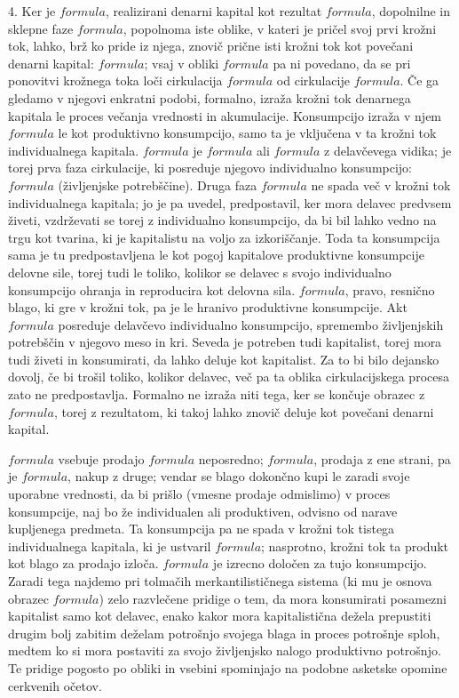 \documentclass[kapital_02.tex]{subfiles}
\begin{document}
4. Ker je \( formula \), realizirani denarni kapital kot rezultat \( formula \), dopolnilne in sklepne faze \( formula \), popolnoma iste oblike, v kateri je pričel svoj prvi krožni tok, lahko, brž ko pride iz njega, znovič prične isti krožni tok kot povečani denarni kapital: \( formula \); vsaj v obliki \( formula \) pa ni povedano, da se pri ponovitvi krožnega toka loči cirkulacija \( formula \) od cirkulacije \( formula \). Če ga gledamo v njegovi enkratni podobi, formalno, izraža krožni tok denarnega kapitala le proces večanja vrednosti in akumulacije. Konsumpcijo izraža v njem \( formula \) le kot produktivno konsumpcijo, samo ta je vključena v ta krožni tok individualnega kapitala. \( formula \) je \( formula \) ali \( formula \) z delavčevega vidika; je torej prva faza cirkulacije, ki posreduje njegovo individualno konsumpcijo: \( formula \) (življenjske potrebščine). Druga faza \( formula \) ne spada več v krožni tok individualnega kapitala; jo je pa uvedel, predpostavil, ker mora delavec predvsem živeti, vzdrževati se torej z individualno konsumpcijo, da bi bil lahko vedno na trgu kot tvarina, ki je kapitalistu na voljo za izkoriščanje. Toda ta konsumpcija sama je tu predpostavljena le kot pogoj kapitalove produktivne konsumpcije delovne sile, torej tudi le toliko, kolikor se delavec s svojo individualno konsumpcijo ohranja in reproducira kot delovna sila. \( formula \), pravo, resnično blago, ki gre v krožni tok, pa je le hranivo produktivne konsumpcije. Akt \( formula \) posreduje delavčevo individualno konsumpcijo, spremembo življenjskih potrebščin v njegovo meso in kri. Seveda je potreben tudi kapitalist, torej mora tudi živeti in konsumirati, da lahko deluje kot kapitalist. Za to bi bilo dejansko dovolj, če bi trošil toliko, kolikor delavec, več pa ta oblika cirkulacijskega procesa zato ne predpostavlja. Formalno ne izraža niti tega, ker se končuje obrazec z \( formula \), torej z rezultatom, ki takoj lahko znovič deluje kot povečani denarni kapital.

\( formula \) vsebuje prodajo \( formula \) neposredno; \( formula \), prodaja z ene strani, pa je \( formula \), nakup z druge; vendar se blago dokončno kupi le zaradi svoje uporabne vrednosti, da bi prišlo (vmesne prodaje odmislimo) v proces konsumpcije, naj bo že individualen ali produktiven, odvisno od narave kupljenega predmeta. Ta konsumpcija pa ne spada v krožni tok tistega individualnega kapitala, ki je ustvaril \( formula \); nasprotno, krožni tok ta produkt kot blago za prodajo izloča. \( formula \) je izrecno določen za tujo konsumpcijo. Zaradi tega najdemo pri tolmačih merkantilističnega sistema (ki mu je osnova obrazec \( formula \)) zelo razvlečene pridige o tem, da mora konsumirati posamezni kapitalist samo kot delavec, enako kakor mora kapitalistična dežela prepustiti drugim bolj zabitim deželam potrošnjo svojega blaga in proces potrošnje sploh, medtem ko si mora postaviti za svojo življenjsko nalogo produktivno potrošnjo. Te pridige pogosto po obliki in vsebini spominjajo na podobne asketske opomine cerkvenih očetov.
\end{document}
